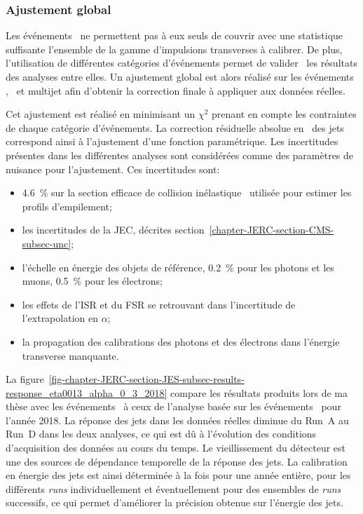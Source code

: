 \subsubsection{Ajustement global}\label{chapter-JERC-section-JES-subsec-results-subsubsec-global_fit}
Les événements \Gjets\ ne permettent pas à eux seuls de couvrir avec une statistique suffisante l'ensemble de la gamme d'impulsions transverses à calibrer.
De plus, l'utilisation de différentes catégories d'événements permet de valider \aposteriori\ les résultats des analyses entre elles.
Un ajustement global est alors réalisé sur les événements \Zjets, \Gjets\ et multijet afin d'obtenir la correction finale à appliquer aux données réelles.
\par Cet ajustement est réalisé en minimisant un $\chi^2$ prenant en compte les contraintes de chaque catégorie d'événements.
La correction résiduelle absolue en \pT\ des jets correspond ainsi à l'ajustement d'une fonction paramétrique.
Les incertitudes présentes dans les différentes analyses sont considérées comme des paramètres de nuisance pour l'ajustement. Ces incertitudes sont:
\begin{itemize}
\item \SI{4.6}{\%} sur la section efficace de collision inélastique \proton\proton\ utilisée pour estimer les profils d'empilement;
\item les incertitudes de la JEC, décrites section~\ref{chapter-JERC-section-CMS-subsec-unc};
\item l'échelle en énergie des objets de référence, \SI{0.2}{\%} pour les photons et les muons, \SI{0.5}{\%} pour les électrons;
\item les effets de l'ISR et du FSR se retrouvant dans l'incertitude de l'extrapolation en $\alpha$;
\item la propagation des calibrations des photons et des électrons dans l'énergie transverse manquante.
\end{itemize}
\par La figure~\ref{fig-chapter-JERC-section-JES-subsec-results-response_eta0013_alpha_0_3_2018} compare les résultats produits lors de ma thèse avec les événements \Gjets\ à ceux de l'analyse basée sur les événements \Zmmjets\ pour l'année 2018.
La réponse des jets dans les données réelles diminue du Run~A au Run~D dans les deux analyses, ce qui est dû à l'évolution des conditions d'acquisition des données au cours du temps.
Le vieillissement du détecteur est une des sources de dépendance temporelle de la réponse des jets.
La calibration en énergie des jets est ainsi déterminée à la fois pour une année entière, pour les différents \emph{runs} individuellement et éventuellement pour des ensembles de \emph{runs} successifs, ce qui permet d'améliorer la précision obtenue sur l'énergie des jets.
